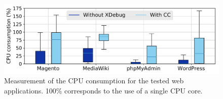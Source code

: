 \begin{figure}[t]
  \includegraphics[width=\linewidth]{figures/lim/cpu.pdf}
  \caption{Measurement of the CPU consumption for the tested web
  applications. 100\% corresponds to the use of a single CPU core.}
  \label{fig:cpu}
\end{figure}